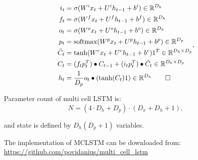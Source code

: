 \documentclass[a4paper,11pt]{article}
\makeatletter
\newcommand{\change@uppercase@math}{%
  \count@=`\A
  \loop
    \mathcode\count@\count@
    \ifnum\count@<`\Z
    \advance\count@\@ne
  \repeat}
\newcommand{\softmax}[1]{
  \mathrm{softmax}(
}
\makeatother
\begin{document}
\begin{align}
\begin{split}
\label{LSTM}
i_{t} &=\sigma(W^{i}x_{t} + U^{i}h_{t-1} + b^{i}) \in \mathbb{R}^{D_{h}}\\
f_{t} &=\sigma(W^{f}x_{t} + U^{f}h_{t-1} + b^{f})\in \mathbb{R}^{D_{h}}\\
o_{t} &=\sigma(W^{o}x_{t} + U^{o}h_{t-1} + b^{o})\in \mathbb{R}^{D_{h}}\\
p_{t} &=\softmax(W^{p}x_{t} + U^{p}h_{t-1} + b^{p}) \in \mathbb{R}^{D_{p}}\\
\tilde{C}_{t} &= \tanh(W^{c}x_{t} + U^{c}h_{t-1} + b^{c})1^{T}\in \mathbb{R}^{D_{h}
\times D_{p}}\\
C_{t} &=(f_{t} p_{t}^{T}) \bullet C_{t-1} + (i_{t} p_{t}^{T}) \bullet \tilde{C}_{t}\in \mathbb{R}^{D_{h}\times D_{p}} \\
h_{t} &= \frac{1}{D_{p}} o_{t} \bullet (\tanh(C_{t}) 1) \in \mathbb{R}^{D_{h}}\qedhere
\end{split},
\end{align}

Parameter count of multi cell LSTM is:
\begin{equation}
\label{eq:multi_cell_lstm_parameter_count}
N =  (4 \cdot D_{h}  + D_{p})\cdot (D_{x}  + D_{h} + 1),
\end{equation}

and state is defined by $D_{h}(D_{p} + 1)$ variables.

The implementation of MCLSTM can be downloaded from:
\url{https://github.com/povidanius/multi_cell_lstm}






\end{document}
